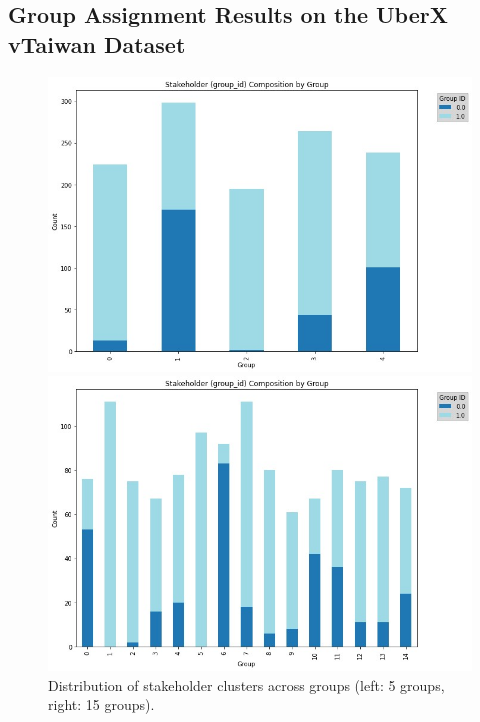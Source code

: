 \subsection{Group Assignment Results on the UberX vTaiwan Dataset}

\begin{figure}[H]
    \centering
    \begin{minipage}[t]{0.49\textwidth}
        \centering
        \includegraphics[width=\linewidth]{assets/groupiing_5.JPG}
    \end{minipage}
    \hfill
    \begin{minipage}[t]{0.49\textwidth}
        \centering
        \includegraphics[width=\linewidth]{assets/grouping_15.JPG}
    \end{minipage}
    \caption{Distribution of stakeholder clusters across groups (left: 5 groups, right: 15 groups).}
    \label{fig:grouping_5_n_15}
\end{figure}

